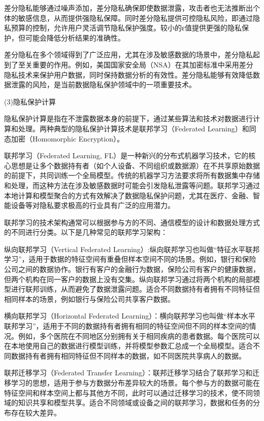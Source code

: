 差分隐私能够通过噪声添加，差分隐私确保即使数据泄露，攻击者也无法推断出个体的敏感信息，从而提供强隐私保障。同时差分隐私提供可控隐私风险，即通过隐私预算的控制，允许用户灵活调节隐私保护强度。较小的ε值提供更强的隐私保护，但可能会降低分析结果的准确性。

差分隐私在多个领域得到了广泛应用，尤其在涉及敏感数据的场景中，差分隐私起到了至关重要的作用。例如，美国国家安全局（NSA）在其加密标准中采用差分隐私技术来保护用户数据，同时保持数据分析的有效性。差分隐私能够有效降低数据泄露的风险，是当前数据隐私保护领域中的一项重要技术。

(3)隐私保护计算

隐私保护计算是指在不泄露数据本身的前提下，通过某些算法和技术对数据进行计算和处理。两种典型的隐私保护计算技术是联邦学习（Federated Learning）和同态加密（Homomorphic Encryption）。


联邦学习（Federated Learning, FL）是一种新兴的分布式机器学习技术，它的核心思想是让多个数据持有者（如个人设备、不同组织或数据源）在不共享原始数据的前提下，共同训练一个全局模型。传统的机器学习方法要求将所有数据集中存储和处理，而这种方法在涉及敏感数据时可能会引发隐私泄露等问题。联邦学习通过本地计算和模型聚合的方式有效解决了数据隐私保护问题，尤其在医疗、金融、智能设备等对隐私要求极高的行业具有广泛的应用潜力。

联邦学习的技术架构通常可以根据参与方的不同、通信模型的设计和数据处理方式的不同进行分类。以下是几种常见的联邦学习架构：

纵向联邦学习（Vertical Federated Learning）:纵向联邦学习也叫做“特征水平联邦学习”，适用于数据的特征空间有重叠但样本空间不同的场景。例如，银行和保险公司之间的数据协作。银行有客户的金融行为数据，保险公司有客户的健康数据，但两个机构在同一客户的数据上没有交集。纵向联邦学习通过将两个机构的局部模型进行联邦训练，从而避免了数据泄露问题。适合不同数据持有者拥有不同特征但相同样本的场景，例如银行与保险公司共享客户数据。

横向联邦学习（Horizontal Federated Learning）：横向联邦学习也叫做“样本水平联邦学习”，适用于不同的数据持有者拥有相同的特征空间但不同的样本空间的情况。例如，多个医院在不同地区分别拥有关于相同疾病的患者数据。每个医院可以在本地使用自己的数据进行模型训练，并将模型参数汇总成一个全局模型。适合不同数据持有者拥有相同特征但不同样本的数据，如不同医院共享病人的数据。

联邦迁移学习（Federated Transfer Learning）：联邦迁移学习结合了联邦学习和迁移学习的思想，适用于参与方数据分布差异较大的场景。每个参与方的数据可能在特征空间和样本空间上都与其他方不同，此时可以通过迁移学习的技术，使不同领域的知识共享和模型共享。适合不同领域或设备之间的联邦学习，数据和任务的分布存在较大差异。

